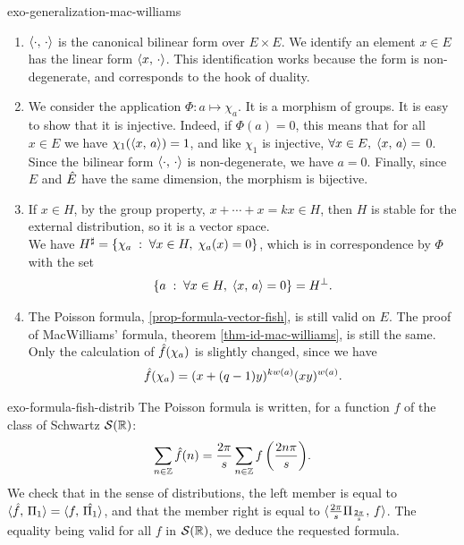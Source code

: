  
\begin{correction}{exo-generalization-mac-williams}
\begin{enumerate}
\item $ \langle \cdot,\,\cdot\rangle $ is the canonical bilinear form over $ E \times E $. We identify an element $ x \in E $ has the linear form $ \langle x,\,\cdot\rangle $. This identification works because the form is non-degenerate, and corresponds to the hook of duality.
\item We consider the application $ \Phi: a \mapsto \chi_a $. It is a morphism of groups. It is easy to show that it is injective. Indeed, if $ \Phi (a) = 0 $, this means that for all $ x \in E $ we have $ \chi_1 (\langle x,\,a\rangle) = 1 $, and like $ \chi_1 $ is injective, $ \forall x \in E, \; \langle x,\,a\rangle = $ 0. Since the bilinear form $ \langle \cdot,\,\cdot\rangle $ is non-degenerate, we have $ a = 0 $. Finally, since $ E $ and $ \hat{E} $ have the same dimension, the morphism is bijective.
\item If $ x \in H $, by the group property, $ x + \cdots + x = kx \in H $, then $ H $ is stable for the external distribution, so it is a vector space. \\We have $ H^\sharp = \left\{ \chi_a \;:\; \forall x \in H, \; \chi_a (x) = 0 \right\} $, which is in correspondence by $ \Phi $ with the set 
$$ \left\{ a \;:\; \forall x \in H, \; \langle x,\,a\rangle = 0 \right\} = H^\bot .$$
\item The Poisson formula, \ref{prop-formula-vector-fish}, is still valid on $ E $. The proof of MacWilliams' formula, theorem \ref{thm-id-mac-williams}, is still the same. Only the calculation of $ \hat{f} (\chi_a) $ is slightly changed, since we have
\begin{equation*}
\hat{f} (\chi_a) = (x + (q-1) y)^{kw (a)} (xy)^{w (a)}.
\end{equation*}
\end{enumerate}
\end{correction}
 
 
\begin{correction}{exo-formula-fish-distrib}
 The Poisson formula is written, for a function $ f $ of the class of Schwartz $ \mathcal{S} (\mathbb{R}) $:
\begin{equation*}
\sum_{n \in \mathbb{Z}}{\hat{f} (n)} = \frac{2 \pi}{s} \sum_{n \in \mathbb{Z}}{f \left(\frac{2 n \pi}{s} \right)}.
\end{equation*}
We check that in the sense of distributions, the left member is equal to $ \langle \hat{f},\,\Pi_1\rangle = \langle f,\,\hat{\Pi_1}\rangle $, and that the member right is equal to $ \langle \frac{2 \pi}{s} \Pi_{\frac{2 \pi}{s}},\,f\rangle $. The equality being valid for all $ f $ in $ \mathcal{S} (\mathbb{R}) $, we deduce the requested formula.
\end{correction}
 
